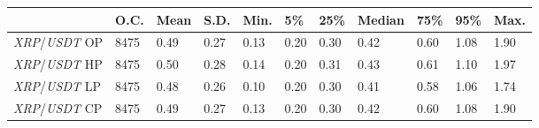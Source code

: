 \begin{tabular}{lllllllllll}
\toprule
 & \textbf{O.C.} & \textbf{Mean} & \textbf{S.D.} & \textbf{Min.} & \textbf{5\%} & \textbf{25\%} & \textbf{Median} & \textbf{75\%} & \textbf{95\%} & \textbf{Max.} \\
\midrule
\emph{XRP}/\emph{USDT} OP & 8475 & 0.49 & 0.27 & 0.13 & 0.20 & 0.30 & 0.42 & 0.60 & 1.08 & 1.90 \\
\emph{XRP}/\emph{USDT} HP & 8475 & 0.50 & 0.28 & 0.14 & 0.20 & 0.31 & 0.43 & 0.61 & 1.10 & 1.97 \\
\emph{XRP}/\emph{USDT} LP & 8475 & 0.48 & 0.26 & 0.10 & 0.20 & 0.30 & 0.41 & 0.58 & 1.06 & 1.74 \\
\emph{XRP}/\emph{USDT} CP & 8475 & 0.49 & 0.27 & 0.13 & 0.20 & 0.30 & 0.42 & 0.60 & 1.08 & 1.90 \\
\bottomrule
\end{tabular}
